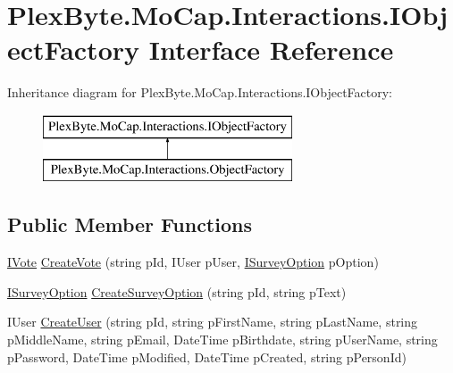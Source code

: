 \hypertarget{interface_plex_byte_1_1_mo_cap_1_1_interactions_1_1_i_object_factory}{}\section{Plex\+Byte.\+Mo\+Cap.\+Interactions.\+I\+Object\+Factory Interface Reference}
\label{interface_plex_byte_1_1_mo_cap_1_1_interactions_1_1_i_object_factory}
Inheritance diagram for Plex\+Byte.\+Mo\+Cap.\+Interactions.\+I\+Object\+Factory\+:\begin{figure}[H]
\begin{center}
\leavevmode
\includegraphics[height=2.000000cm]{interface_plex_byte_1_1_mo_cap_1_1_interactions_1_1_i_object_factory}
\end{center}
\end{figure}
\subsection*{Public Member Functions}
\begin{DoxyCompactItemize}
\item 
\hyperlink{interface_plex_byte_1_1_mo_cap_1_1_interactions_1_1_i_vote}{I\+Vote} \hyperlink{interface_plex_byte_1_1_mo_cap_1_1_interactions_1_1_i_object_factory_ab5ccd5e80e15d76d79504bfe4da715ca}{Create\+Vote} (string p\+Id, I\+User p\+User, \hyperlink{interface_plex_byte_1_1_mo_cap_1_1_interactions_1_1_i_survey_option}{I\+Survey\+Option} p\+Option)
\item 
\hyperlink{interface_plex_byte_1_1_mo_cap_1_1_interactions_1_1_i_survey_option}{I\+Survey\+Option} \hyperlink{interface_plex_byte_1_1_mo_cap_1_1_interactions_1_1_i_object_factory_ad181f2994305f53982828d0d3d8c4621}{Create\+Survey\+Option} (string p\+Id, string p\+Text)
\item 
I\+User \hyperlink{interface_plex_byte_1_1_mo_cap_1_1_interactions_1_1_i_object_factory_ab92eabebbc7307ae04940f46c88b2a30}{Create\+User} (string p\+Id, string p\+First\+Name, string p\+Last\+Name, string p\+Middle\+Name, string p\+Email, Date\+Time p\+Birthdate, string p\+User\+Name, string p\+Password, Date\+Time p\+Modified, Date\+Time p\+Created, string p\+Person\+Id)
\end{DoxyCompactItemize}


